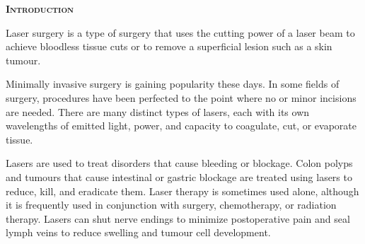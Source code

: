 \documentclass[12pt]{article}
\begin{document}
\newpage
\pagestyle{fancy}
\begin{center}
    \textsc{\huge\textbf{Introduction}}
\end{center}
 
 \indent
 
\hspace{2.5cm}Laser surgery is a type of surgery that uses the cutting power of a laser beam to achieve bloodless tissue cuts or to remove a superficial lesion such as a skin tumour.

\hspace{2.5cm} Minimally invasive surgery is gaining popularity these days. In some fields of surgery, procedures have been perfected to the point where no or minor incisions are needed. There are many distinct types of lasers, each with its own wavelengths of emitted light, power, and capacity to coagulate, cut, or evaporate tissue.
\indent

\hspace{2.5cm}Lasers are used to treat disorders that cause bleeding or blockage. Colon polyps and tumours that cause intestinal or gastric blockage are treated using lasers to reduce, kill, and eradicate them. Laser therapy is sometimes used alone, although it is frequently used in conjunction with surgery, chemotherapy, or radiation therapy. Lasers can shut nerve endings to minimize postoperative pain and seal lymph veins to reduce swelling and tumour cell development.

\newpage
\end{document}
